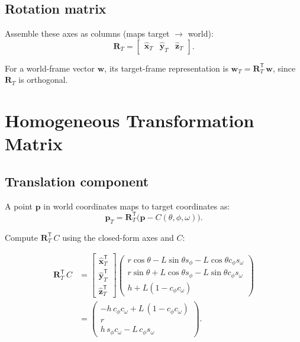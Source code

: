 \documentclass[12pt,a4paper]{article}
\newcommand{\Rd}{\mathbf{R}}
\newcommand{\RT}{\Rd_T}
\begin{document}
\subsection{Rotation matrix}

Assemble these axes as columns (maps target $\to$ world):
\begin{equation}\label{eq:RT}
  \boxed{
  \RT
  = \begin{bmatrix}
      \hat{\mathbf{x}}_T & \hat{\mathbf{y}}_T & \hat{\mathbf{z}}_T
    \end{bmatrix}.
  }
\end{equation}

For a world-frame vector $\mathbf{w}$, its target-frame representation is
$\mathbf{w}_T = \RT^\mathsf{T}\,\mathbf{w}$, since $\RT$ is orthogonal.

\section{Homogeneous Transformation Matrix}

\subsection{Translation component}

A point $\mathbf{p}$ in world coordinates maps to target coordinates as:
\[
  \mathbf{p}_T = \RT^\mathsf{T}\bigl(\mathbf{p} - C(\theta,\phi,\omega)\bigr).
\]

Compute $\RT^\mathsf{T}\,C$ using the closed-form axes and $C$:

\begin{align}
  \RT^\mathsf{T}\,C &=
  \begin{bmatrix}
    \hat{\mathbf{x}}_T^\mathsf{T} \\[2pt]
    \hat{\mathbf{y}}_T^\mathsf{T} \\[2pt]
    \hat{\mathbf{z}}_T^\mathsf{T}
  \end{bmatrix}
  \begin{pmatrix}
      r\cos\theta - L\sin\theta s_\phi - L\cos\theta c_\phi s_\omega \\
      r\sin\theta + L\cos\theta s_\phi - L\sin\theta c_\phi s_\omega \\
      h + L(1 - c_\phi c_\omega)
  \end{pmatrix}
  \nonumber \\[8pt]
  &= \begin{pmatrix}
      -h\,c_\phi c_\omega + L\,(1 - c_\phi c_\omega) \\
      r \\
      h\,s_\phi c_\omega - L\,c_\phi s_\omega
  \end{pmatrix}. \label{eq:RtC}
\end{align}
\end{document}

